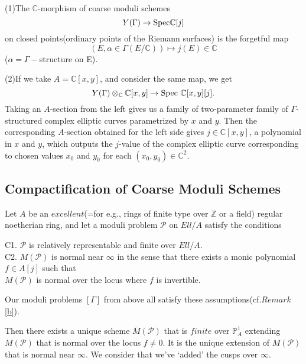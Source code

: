 \documentclass[a4paper,11pt]{article}
\begin{document}
\begin{exm}
(1)The $\mathbb{C}$-morphism of coarse moduli schemes
\[
Y(\Gamma) \to \textnormal{Spec}\mathbb{C}[j]
\]
on closed points(ordinary points of the Riemann surfaces) is the forgetful map
\[
(E,\alpha \in \Gamma(E/\mathbb{C})) \mapsto j(E) \in \mathbb{C}
\]
($\alpha=\Gamma-$structure on E).

(2)If we take $A=\mathbb{C}[x,y]$, and consider the same map, we get
\[
Y(\Gamma) \otimes_{\mathbb{C}} \mathbb{C}[x,y] \to \textnormal{Spec }\mathbb{C}[x,y][j].
\]
Taking an $A$-section from the left gives us a family of two-parameter family of $\Gamma$-structured complex elliptic curves parametrized by $x$ and $y$.
Then the corresponding $A$-section obtained for the left side gives $j\in\mathbb{C}[x,y]$, a polynomial in $x$ and $y$, which outputs the $j$-value of the complex elliptic curve corresponding to chosen values $x_0$ and $y_0$ for each $(x_0,y_0)\in\mathbb{C}^2$.

\end{exm}

\subsection{Compactification of Coarse Moduli Schemes}

Let $A$ be an $\textit{excellent}$(=for e.g., rings of finite type over $\mathbb{Z}$ or a field) regular noetherian ring, and let a moduli problem $\mathcal{P}$ on $Ell/A$ satisfy the conditions

\begin{flushleft}
C1. $\mathcal{P}$ is relatively representable and finite over $Ell/A$.\\
C2. $M(\mathcal{P})$ is normal near $\infty$ in the sense that there exists a monic polynomial $f\in$$A[j]$ such that\\ $M(\mathcal{P})$ is normal over the locus where $f$ is invertible.
\end{flushleft}

\begin{rem}
Our moduli problems $[\Gamma]$ from above all satisfy these assumptions(cf.$\textit{Remark}$ \ref{b}).
\end{rem}

Then there exists a unique scheme $\overline{M}(\mathcal{P})$ that is $\textit{finite}$ over $\mathbb{P}^1_A$ extending $M(\mathcal{P})$ that is normal over the locus $f\neq0$.
It is the unique extension of $M(\mathcal{P})$ that is normal near $\infty$.
We consider that we've `added' the cusps over $\infty$.
\end{document}
